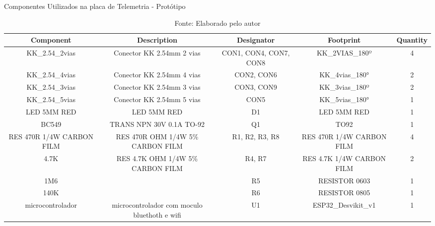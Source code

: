 \documentclass[../delivery_hospital_report.tex]{subfiles}
\begin{document}
\begin{table}[]
\caption{Componentes Utilizados na placa de Telemetria - Protótipo}
\centering
\begin{adjustbox}{width=\columnwidth,center}
\begin{tabular}{|c|c|c|c|c|}
\hline
Component                   & Description                                    & Designator               & Footprint                   & Quantity \\ \hline
KK\_2.54\_2vias             & Conector KK 2.54mm 2   vias                    & CON1, CON4, CON7,   CON8 & KK\_2VIAS\_180º             & 4        \\ \hline
KK\_2.54\_4vias             & Conector KK 2.54mm 4   vias                    & CON2, CON6               & KK\_4vias\_180°             & 2        \\ \hline
KK\_2.54\_3vias             & Conector KK 2.54mm 3   vias                    & CON3, CON9               & KK\_3vias\_180º             & 2        \\ \hline
KK\_2.54\_5vias             & Conector KK 2.54mm 5   vias                    & CON5                     & KK\_5vias\_180°             & 1        \\ \hline
LED 5MM RED                 & LED 5MM RED                                    & D1                       & LED 5MM RED                 & 1        \\ \hline
BC549                       & TRANS NPN 30V 0.1A   TO-92                     & Q1                       & TO92                        & 1        \\ \hline
RES 470R 1/4W   CARBON FILM & RES 470R OHM 1/4W 5\%   CARBON FILM            & R1, R2, R3, R8           & RES 470R 1/4W CARBON   FILM & 4        \\ \hline
4.7K                        & RES 4.7K OHM 1/4W 5\%   CARBON FILM            & R4, R7                   & RES 4.7K 1/4W CARBON   FILM & 2        \\ \hline
1M6                         &                                                & R5                       & RESISTOR 0603               & 1        \\ \hline
140K                        &                                                & R6                       & RESISTOR 0805               & 1        \\ \hline
microcontrolador            & microcontrolador com   moculo bluethoth e wifi & U1                       & ESP32\_Desvikit\_v1         & 1        \\ \hline

\end{tabular}
\end{adjustbox}
\centering
\caption*{Fonte: Elaborado pelo autor}
\label{table:voc}
\end{table}
\end{document}
